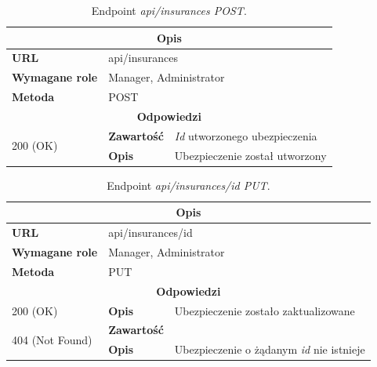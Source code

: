 \documentclass[eng,printmode,openany]{mgr}
\begin{document}
\begin{table}[H]
	\caption{Endpoint \textit{api/insurances POST}.}
	\begin{tabularx}{\textwidth}{|l|l|X|}
		\hline
		\multicolumn{3}{|c|}{\textbf{\textbf{Opis}}}
		\\ \hline
		\textbf{URL}                       & \multicolumn{2}{l|}{api/insurances}
		\\ \hline
		\textbf{Wymagane role}             & \multicolumn{2}{l|}{Manager, Administrator}
		\\ \hline
		\textbf{Metoda}                    & \multicolumn{2}{l|}{POST}
		\\ \hline
		\multicolumn{3}{|c|}{\textbf{Odpowiedzi}}
		\\ \hline
		\multirow{2}{*}{200 (OK)} 		& \textbf{Zawartość}     & \textit{Id} utworzonego ubezpieczenia
		\\ \cline{2-3}                  & \textbf{Opis}         	& Ubezpieczenie został utworzony
		\\ \hline
	\end{tabularx}
\end{table}

\begin{table}[H]
	\caption{Endpoint \textit{api/insurances/id PUT}.}
	\begin{tabularx}{\textwidth}{|l|l|X|}
		\hline
		\multicolumn{3}{|c|}{\textbf{\textbf{Opis}}}
		\\ \hline
		\textbf{URL}                       & \multicolumn{2}{l|}{api/insurances/id}
		\\ \hline
		\textbf{Wymagane role}             & \multicolumn{2}{l|}{Manager, Administrator}
		\\ \hline
		\textbf{Metoda}                    & \multicolumn{2}{l|}{PUT}
		\\ \hline
		\multicolumn{3}{|c|}{\textbf{Odpowiedzi}}
		\\ \hline
		200 (OK) 		                        & \textbf{Opis}      	& Ubezpieczenie zostało zaktualizowane
		\\ \hline
		\multirow{2}{*}{404 (Not Found)} 	    & \textbf{Zawartość}     & 
		\\ \cline{2-3}                          & \textbf{Opis}          & Ubezpieczenie o żądanym \textit{id} nie istnieje
		\\ \hline
	\end{tabularx}
\end{table}
\end{document}
